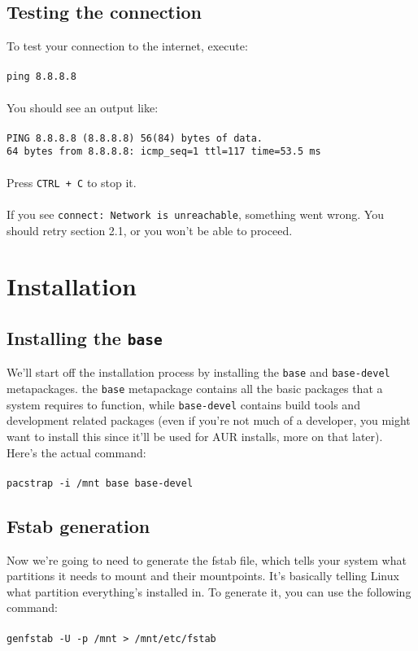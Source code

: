 \documentclass{article}
\begin{document}
\subsection{Testing the connection}
To test your connection to the internet, execute:
\\\\\texttt{ping 8.8.8.8}
\\\\
You should see an output like:\\
\texttt{
  \\
  PING 8.8.8.8 (8.8.8.8) 56(84) bytes of data.\\
64 bytes from 8.8.8.8: icmp\_seq=1 ttl=117 time=53.5 ms\\
}
\\
Press \texttt{CTRL + C} to stop it.
\\\\
If you see \texttt{connect: Network is unreachable}, something went wrong. You should retry section 2.1, or you won't be able to proceed.

\section{Installation}
\subsection{Installing the \texttt{base}}
We'll start off the installation process by installing the \texttt{base} and \texttt{base-devel} metapackages. the \texttt{base} metapackage contains all the basic packages that a system requires to function, while \texttt{base-devel} contains build tools and development related packages (even if you're not much of a developer, you might want to install this since it'll be used for AUR installs, more on that later). Here's the actual command:
\\\\
\texttt{pacstrap -i /mnt base base-devel}

\subsection{Fstab generation}
Now we're going to need to generate the fstab file, which tells your system what partitions it needs to mount and their mountpoints. It's basically telling Linux what partition everything's installed in. To generate it, you can use the following command:
\\\\
\texttt{genfstab -U -p /mnt > /mnt/etc/fstab}
\end{document}
